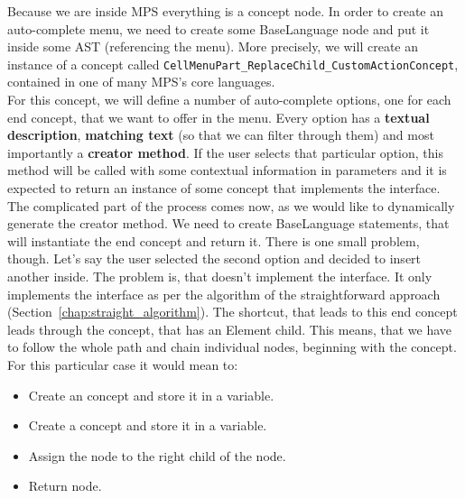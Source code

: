 Because we are inside MPS everything is a concept node.
In order to create an auto-complete menu, we need to create some BaseLanguage node and put it inside some AST (referencing the menu).
More precisely, we will create an instance of a concept called \texttt{CellMenuPart{\_}ReplaceChild{\_}CustomActionConcept}, contained in one of many MPS's core languages.
\\

For this concept, we will define a number of auto-complete options, one for each end concept, that we want to offer in the menu.
Every option has a \textbf{textual description}, \textbf{matching text} (so that we can filter through them) and most importantly a \textbf{creator method}.
If the user selects that particular option, this method will be called with some contextual information in parameters and it is expected to return an instance of some concept that implements the  interface.
\\

The complicated part of the process comes now, as we would like to dynamically generate the creator method.
We need to create BaseLanguage statements, that will instantiate the end concept and return it.
There is one small problem, though.
Let's say the user selected the second option and decided to insert another  inside.
The problem is, that  doesn't implement the  interface.
It only implements the  interface as per the algorithm of the straightforward approach (Section~\ref{chap:straight_algorithm}).
The shortcut, that leads to this end concept leads through the  concept, that has an Element child.
This means, that we have to follow the whole path and chain individual nodes, beginning with the  concept.
For this particular case it would mean to:

\begin{itemize}
	\item Create an  concept and store it in a variable.

	\item Create a  concept and store it in a variable.

	\item Assign the  node to the right child of the  node.

	\item Return  node.
\end{itemize}

